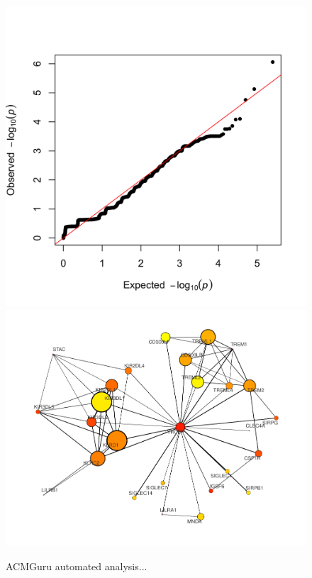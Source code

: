 \documentclass{article}
\begin{document}
\begin{figure}[h] \hspace*{0cm} 
\begin{center}
    \includegraphics[scale=0.06]{../images/acmguru/plink_assoc_ppman_qq}
     \includegraphics[scale=0.35]{../images/acmguru/ppi_network_22}
    	\caption{ACMGuru automated analysis...}
	\label{fig:plink_assoc_ppman_qq}
	\label{fig:ppi_network_22}
\end{center}
\end{figure}
\end{document}
